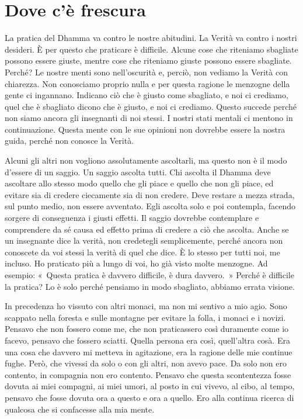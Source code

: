 \chapter{Dove c'è frescura}

La pratica del Dhamma va contro le nostre abitudini. La Verità va contro
i nostri desideri. È per questo che praticare è difficile. Alcune cose
che riteniamo sbagliate possono essere giuste, mentre cose che riteniamo
giuste possono essere sbagliate. Perché? Le nostre menti sono
nell'oscurità e, perciò, non vediamo la Verità con chiarezza. Non
conosciamo proprio nulla e per questa ragione le menzogne della gente ci
ingannano. Indicano ciò che è giusto come sbagliato, e noi ci crediamo,
quel che è sbagliato dicono che è giusto, e noi ci crediamo. Questo
succede perché non siamo ancora gli insegnanti di noi stessi. I nostri
stati mentali ci mentono in continuazione. Questa mente con le sue
opinioni non dovrebbe essere la nostra guida, perché non conosce la
Verità.

Alcuni gli altri non vogliono assolutamente ascoltarli, ma questo non è
il modo d'essere di un saggio. Un saggio ascolta tutti. Chi ascolta il
Dhamma deve ascoltare allo stesso modo quello che gli piace e quello che
non gli piace, ed evitare sia di credere ciecamente sia di non credere.
Deve restare a mezza strada, sul punto medio, non essere avventato. Egli
ascolta solo e poi contempla, facendo sorgere di conseguenza i giusti
effetti. Il saggio dovrebbe contemplare e comprendere da sé causa ed
effetto prima di credere a ciò che ascolta. Anche se un insegnante dice
la verità, non credetegli semplicemente, perché ancora non conoscete da
voi stessi la verità di quel che dice. È lo stesso per tutti noi, me
incluso. Ho praticato più a lungo di voi, ho già visto molte menzogne.
Ad esempio: «~Questa pratica è davvero difficile, è dura davvero.~»
Perché è difficile la pratica? Lo è solo perché pensiamo in modo
sbagliato, abbiamo errata visione.

In precedenza ho vissuto con altri monaci, ma non mi sentivo a mio agio.
Sono scappato nella foresta e sulle montagne per evitare la folla, i
monaci e i novizi. Pensavo che non fossero come me, che non praticassero
così duramente come io facevo, pensavo che fossero sciatti. Quella
persona era così, quell'altra cosà. Era una cosa che davvero mi metteva
in agitazione, era la ragione delle mie continue fughe. Però, che
vivessi da solo o con gli altri, non avevo pace. Da solo non ero
contento, in compagnia non ero contento. Pensavo che questa scontentezza
fosse dovuta ai miei compagni, ai miei umori, al posto in cui vivevo, al
cibo, al tempo, pensavo che fosse dovuta ora a questo e ora a quello.
Ero alla continua ricerca di qualcosa che si confacesse alla mia mente.

